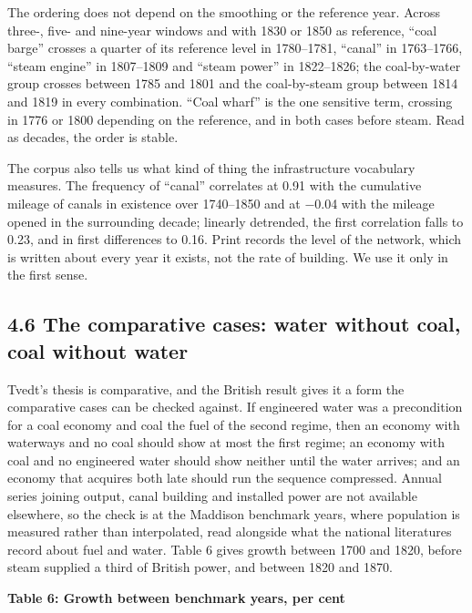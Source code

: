 \documentclass[
  11pt,
]{article}
\begin{document}
The ordering does not depend on the smoothing or the reference year.
Across three-, five- and nine-year windows and with 1830 or 1850 as
reference, ``coal barge'' crosses a quarter of its reference level in
1780--1781, ``canal'' in 1763--1766, ``steam engine'' in 1807--1809 and
``steam power'' in 1822--1826; the coal-by-water group crosses between
1785 and 1801 and the coal-by-steam group between 1814 and 1819 in every
combination. ``Coal wharf'' is the one sensitive term, crossing in 1776
or 1800 depending on the reference, and in both cases before steam. Read
as decades, the order is stable.

The corpus also tells us what kind of thing the infrastructure
vocabulary measures. The frequency of ``canal'' correlates at 0.91 with
the cumulative mileage of canals in existence over 1740--1850 and at
−0.04 with the mileage opened in the surrounding decade; linearly
detrended, the first correlation falls to 0.23, and in first differences
to 0.16. Print records the level of the network, which is written about
every year it exists, not the rate of building. We use it only in the
first sense.

\subsection{4.6 The comparative cases: water without coal, coal without
water}\label{the-comparative-cases-water-without-coal-coal-without-water}

Tvedt's thesis is comparative, and the British result gives it a form
the comparative cases can be checked against. If engineered water was a
precondition for a coal economy and coal the fuel of the second regime,
then an economy with waterways and no coal should show at most the first
regime; an economy with coal and no engineered water should show neither
until the water arrives; and an economy that acquires both late should
run the sequence compressed. Annual series joining output, canal
building and installed power are not available elsewhere, so the check
is at the Maddison benchmark years, where population is measured rather
than interpolated, read alongside what the national literatures record
about fuel and water. Table 6 gives growth between 1700 and 1820, before
steam supplied a third of British power, and between 1820 and 1870.

\textbf{Table 6: Growth between benchmark years, per cent}
\end{document}
